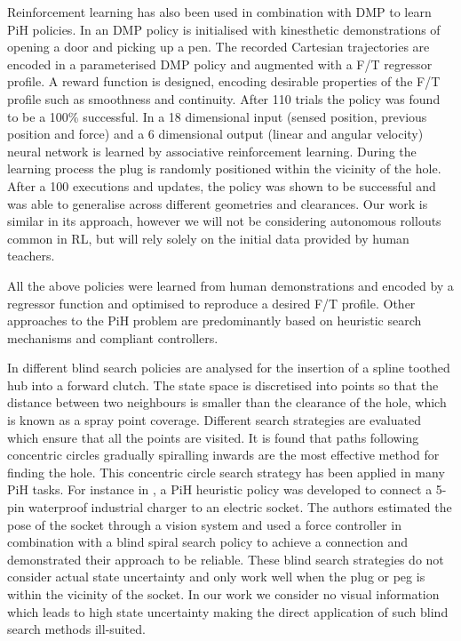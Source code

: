 Reinforcement learning has also been used in combination with DMP to learn PiH policies. In \cite{learn_force_c_icirs_2011}
an DMP policy is initialised with kinesthetic demonstrations of opening a door and picking up a pen. The recorded Cartesian 
trajectories are encoded in a parameterised DMP policy and augmented with a F/T regressor profile. A reward function is designed, 
encoding desirable properties of the F/T profile such as smoothness and continuity. After 110 trials the policy
was found to be a 100\% successful. In \cite{learn_admittance_icra_1994} a 18 dimensional input (sensed position, previous position and force) 
and a 6 dimensional output (linear and angular velocity) neural network is learned by associative reinforcement learning. 
During the learning process the plug is randomly positioned within the vicinity of the hole. After a 100 executions and 
updates, the policy was shown to be successful and was able to generalise across different geometries and clearances.
Our work is similar in its approach, however we will not be considering autonomous rollouts common 
in RL, but will rely solely on the initial data provided by human teachers.

All the above policies were learned from human demonstrations and encoded by a regressor function and
optimised to reproduce a desired F/T profile. Other approaches to the PiH problem 
are predominantly based on heuristic search mechanisms and compliant controllers.

In \cite{search_strategies_icra_2001} different blind search policies are analysed for the insertion of a spline toothed hub 
into a forward clutch. The state space is discretised into points so that the distance between two 
neighbours is smaller than the clearance of the hole, which is known as a spray point coverage. Different search 
strategies are evaluated which ensure that all the points are visited. It is found that paths following  
concentric circles gradually spiralling inwards are the most effective method for finding the hole. This concentric circle
search strategy has been applied in many PiH tasks. For instance in \cite{peg_imcssd_2015}, a PiH heuristic 
policy was developed to connect a 5-pin waterproof industrial charger to an electric socket. The authors 
estimated the pose of the socket through a vision system and used a force controller in combination with a 
blind spiral search policy to achieve a connection and demonstrated their approach to be reliable. 
These blind search strategies do not consider actual state uncertainty and only work well when the plug or 
peg is within the vicinity of the socket. In our work we consider no visual information which leads to 
high state uncertainty making the direct application of such blind search methods ill-suited.

